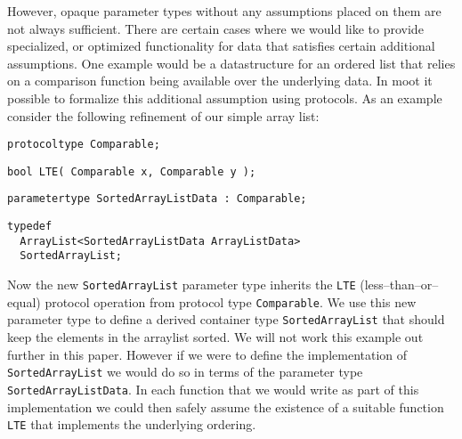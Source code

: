 \documentclass{sigplanconf}
\begin{document}
However, opaque parameter types without any assumptions placed on them
are not always sufficient. There are certain cases where we would like
to provide specialized, or optimized functionality for data that
satisfies certain additional assumptions. One example would be a
datastructure for an ordered list that relies on a comparison function
being available over the underlying data. In {\sc moot} it possible to
formalize this additional assumption using protocols. As an example
consider the following refinement of our simple array list:
\begin{samepage}
\begin{verbatim}
protocoltype Comparable;
\end{verbatim}
\end{samepage}
\begin{samepage}
\begin{verbatim}
bool LTE( Comparable x, Comparable y );
\end{verbatim}
\end{samepage}
\begin{samepage}
\begin{verbatim}
parametertype SortedArrayListData : Comparable;
\end{verbatim}
\end{samepage}
\begin{samepage}
\begin{verbatim}
typedef 
  ArrayList<SortedArrayListData ArrayListData> 
  SortedArrayList;
\end{verbatim}
\end{samepage}

Now the new \verb+SortedArrayList+ parameter type inherits the
\verb+LTE+ (less--than--or--equal) protocol operation from protocol
type \verb+Comparable+. We use this new parameter type to define a
derived container type \verb+SortedArrayList+ that should keep the
elements in the arraylist sorted. We will not work this example out
further in this paper. However if we were to define the implementation
of \verb+SortedArrayList+ we would do so in terms of the parameter
type \verb+SortedArrayListData+. In each function that we would write
as part of this implementation we could then safely assume the
existence of a suitable function \verb+LTE+ that implements the
underlying ordering.
\end{document}
